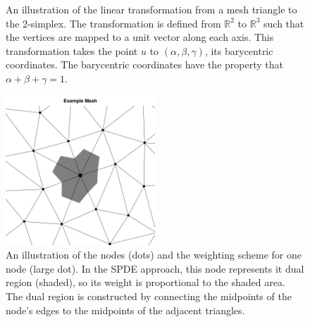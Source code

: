 \documentclass[]{interact}
\begin{document}
\begin{figure}[p]\centering

\hspace{2em}

\caption{An illustration of the linear transformation from a mesh triangle to
the 2-simplex. The transformation is defined from \(\mathbb{R}^{2}\) to
\(\mathbb{R}^{3}\) such that the vertices are mapped to a unit vector along
each axis. This transformation takes the point \(u\) to
\((\alpha, \beta, \gamma)\), its barycentric coordinates. The barycentric
coordinates have the property that \(\alpha + \beta + \gamma = 1\).}
\label{triangle}
\end{figure}

\begin{figure}[t]\centering
\includegraphics[width=0.5\textwidth]{figures/dual.pdf}
\caption{An illustration of the nodes (dots) and the weighting scheme for one
node (large dot). In the SPDE approach, this node represents it dual region
(shaded), so its weight is proportional to the shaded area. The dual region is
constructed by connecting the midpoints of the node's edges to the midpoints
of the adjacent triangles.}
\label{dual}
\end{figure}
\end{document}
